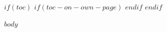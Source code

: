 \documentclass[12pt,a4paper]{article}
\begin{document}
$if(toc)$
$if(toc-on-own-page)$
\newpage
$endif$
\tableofcontents
\newpage
$endif$

$body$
\end{document}
